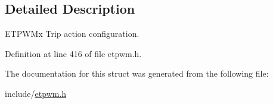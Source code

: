 \subsection{Detailed Description}
E\+T\+P\+W\+Mx Trip action configuration. 

Definition at line 416 of file etpwm.\+h.



The documentation for this struct was generated from the following file\+:\begin{DoxyCompactItemize}
\item 
include/\mbox{\hyperlink{etpwm_8h}{etpwm.\+h}}\end{DoxyCompactItemize}
